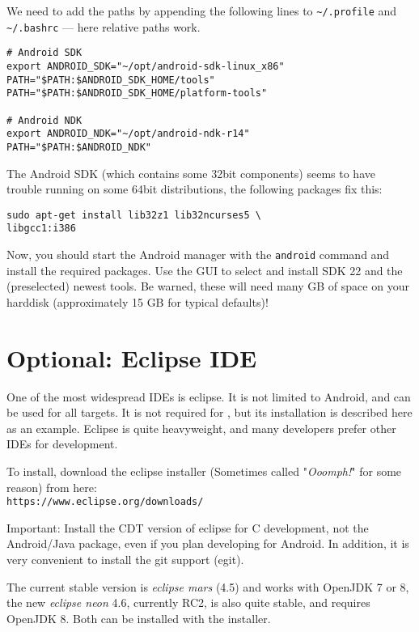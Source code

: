 We need to add the paths by appending the following lines to \texttt{\textasciitilde/.profile} and \texttt{\textasciitilde/.bashrc} --- here relative paths work.

\begin{verbatim}
# Android SDK
export ANDROID_SDK="~/opt/android-sdk-linux_x86"
PATH="$PATH:$ANDROID_SDK_HOME/tools"
PATH="$PATH:$ANDROID_SDK_HOME/platform-tools"

# Android NDK
export ANDROID_NDK="~/opt/android-ndk-r14"
PATH="$PATH:$ANDROID_NDK"
\end{verbatim}

The Android SDK (which contains some 32bit components) seems to have trouble running on some 64bit distributions, the following packages fix this:

\begin{verbatim}
sudo apt-get install lib32z1 lib32ncurses5 \
libgcc1:i386
\end{verbatim}

Now, you should start the Android manager with the \texttt{android} command and install the required packages.
Use the GUI to select and install SDK 22 and the (preselected) newest tools.
Be warned, these will need many GB of space on your harddisk (approximately 15 GB for typical defaults)!

\section{Optional: Eclipse IDE}
One of the most widespread IDEs is eclipse. It is not limited to Android, and can be used for all targets. It is not required for \xc, but its installation is described here as an example. Eclipse is quite heavyweight, and many developers prefer other IDEs for \xc development.

To install, download the eclipse installer (Sometimes called "\emph{Ooomph!}" for some reason) from here:\\
\texttt{https://www.eclipse.org/downloads/}

Important: Install the CDT version of eclipse for C development, not the Android/Java package, even if you plan developing for Android. In addition, it is very convenient to install the git support (egit).

The current stable version is \emph{eclipse mars} (4.5) and works with OpenJDK 7 or 8, the new \emph{eclipse neon} 4.6, currently RC2, is also quite stable, and requires OpenJDK 8. Both can be installed with the installer.


